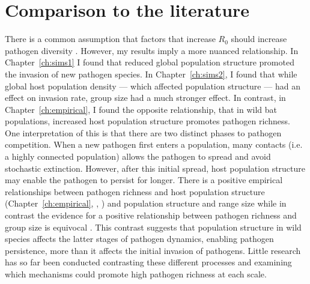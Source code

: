 \section{Comparison to the literature}

There is a common assumption that factors that increase $R_0$ should increase pathogen diversity \cite{nunn2003comparative, morand2000wormy}.
However, my results imply a more nuanced relationship. 
In Chapter~\ref{ch:sims1} I found that reduced global population structure promoted the invasion of new pathogen species.
In Chapter~\ref{ch:sims2}, I found that while global host population density --- which affected population structure --- had an effect on invasion rate, group size had a much stronger effect.
In contrast, in Chapter~\ref{ch:empirical}, I found the opposite relationship, that in wild bat populations, increased host population structure promotes pathogen richness.
One interpretation of this is that there are two distinct phases to pathogen competition.
When a new pathogen first enters a population, many contacts (i.e. a highly connected population) allows the pathogen to spread and avoid stochastic extinction.
However, after this initial spread, host population structure may enable the pathogen to persist for longer.
There is a positive empirical relationships between pathogen richness and host population structure (Chapter~\ref{ch:empirical}, \textcite{turmelle2009correlates}, \textcite{maganga2014bat}) and population structure and range size \cite{kamiya2014determines, nunn2003comparative} while in contrast the evidence for a positive relationship between pathogen richness and  group size is equivocal \cite{rifkin2012animals, ezenwa2006host}.
This contrast suggests that population structure in wild species affects the latter stages of pathogen dynamics, enabling pathogen persistence, more than it affects the initial invasion of pathogens.
Little research has so far been conducted contrasting these different processes and examining which mechanisms could promote high pathogen richness at each scale.






